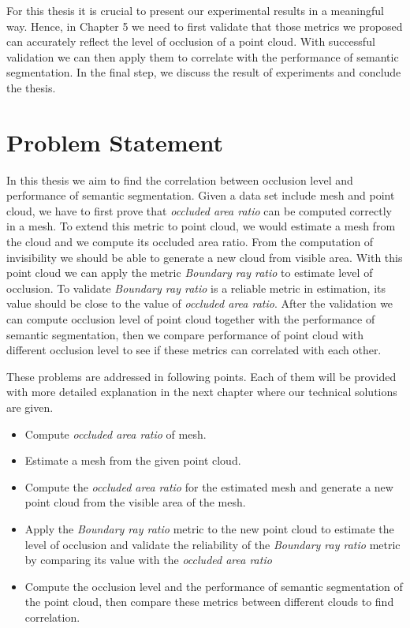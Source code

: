 \documentclass[11pt, a4paper,oneside,chapterprefix=false]{scrbook}
\begin{document}
\vspace{10pt}

For this thesis it is crucial to present our experimental results in a meaningful way. Hence, in Chapter 5 we need to first validate that those metrics we proposed can accurately reflect the level of occlusion of a point cloud. With successful validation we can then apply them to correlate with the performance of semantic segmentation. In the final step, we discuss the result of experiments and conclude the thesis.


\chapter{Problem Statement} \label{chp:problem}

In this thesis we aim to find the correlation between occlusion level and performance of semantic segmentation. Given a data set include mesh and point cloud, we have to first prove that \emph{occluded area ratio} can be computed correctly in a mesh. To extend this metric to point cloud, we would estimate a mesh from the cloud and we compute its occluded area ratio. From the computation of invisibility we should be able to generate a new cloud from visible area. With this point cloud we can apply the metric \emph{Boundary ray ratio} to estimate level of occlusion. To validate \emph{Boundary ray ratio} is a reliable metric in estimation, its value should be close to the value of \emph{occluded area ratio}. After the validation we can compute occlusion level of point cloud together with the performance of semantic segmentation, then we compare performance of point cloud with different occlusion level to see if these metrics can correlated with each other.

\vspace{10pt}

These problems are addressed in following points. Each of them will be provided with more detailed explanation in the next chapter where our technical solutions are given.

\begin{itemize}
    \item Compute \emph{occluded area ratio} of mesh.
    \item Estimate a mesh from the given point cloud.
    \item Compute the \emph{occluded area ratio} for the estimated mesh and generate a new point cloud from the visible area of the mesh.
    \item Apply the \emph{Boundary ray ratio} metric to the new point cloud to estimate the level of occlusion and validate the reliability of the \emph{Boundary ray ratio} metric by comparing its value with the \emph{occluded area ratio}
    \item Compute the occlusion level and the performance of semantic segmentation of the point cloud, then compare these metrics between different clouds to find correlation. 
\end{itemize}
\end{document}
